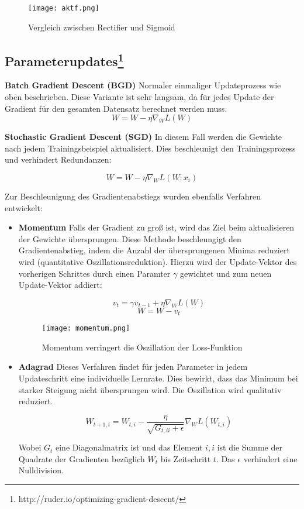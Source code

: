 \documentclass[11pt,fleqn]{book}
\begin{document}
\begin{figure}[h]
\centering
\texttt{[image: aktf.png]}
\caption{Vergleich zwischen Rectifier und Sigmoid}
\end{figure}

\subsection{Parameterupdates\protect\footnote{http://ruder.io/optimizing-gradient-descent/}}
\textbf{Batch Gradient Descent (BGD)}
Normaler einmaliger Updateprozess wie oben beschrieben. Diese Variante ist sehr langsam, da für jedes Update der Gradient für den gesamten Datensatz berechnet werden muss.
\[W = W - \eta \nabla_WL(W)\]

\textbf{Stochastic Gradient Descent (SGD)}
In diesem Fall werden die Gewichte nach jedem Trainingsbeispiel aktualisiert. Dies beschleunigt den Trainingsprozess und verhindert Redundanzen:

\[W=W - \eta \nabla_W L(W;x_i)\]

\bigskip
Zur Beschleunigung des Gradientenabstiegs wurden ebenfalls Verfahren entwickelt:
\begin{itemize}
\item \textbf{Momentum} Falls der Gradient zu groß ist, wird das Ziel beim aktualisieren der Gewichte übersprungen. Diese Methode beschleungigt den Gradientenabstieg, indem die Anzahl der übersprungenen Minima reduziert wird (quantitative Oszillationsreduktion). Hierzu wird der Update-Vektor des vorherigen Schrittes durch einen Paramter $\gamma$ gewichtet und zum neuen Update-Vektor addiert:

\[v_t=\gamma v_{t-1}+\eta \nabla_WL(W)\]
\[W=W-v_t\]

\begin{figure}[h]
\centering
\texttt{[image: momentum.png]}
\caption{Momentum verringert die Oszillation der Loss-Funktion}
\end{figure}



\item \textbf{Adagrad} Dieses Verfahren findet für jeden Parameter in jedem Updateschritt eine individuelle Lernrate. Dies bewirkt, dass das Minimum bei starker Steigung nicht übersprungen wird. Die Oszillation wird qualitativ reduziert.

\[W_{t+1,i}= W_{t,i} - \frac{\eta}{\sqrt{G_{t,ii}+\epsilon}} \nabla_W L(W_{t,i})\]

Wobei $G_{t}$ eine Diagonalmatrix ist und das Element $i,i$ ist die Summe der Quadrate der Gradienten bezüglich $W_t$ bis Zeitschritt $t$. Das $\epsilon$ verhindert eine Nulldivision.
\end{itemize}
\end{document}
